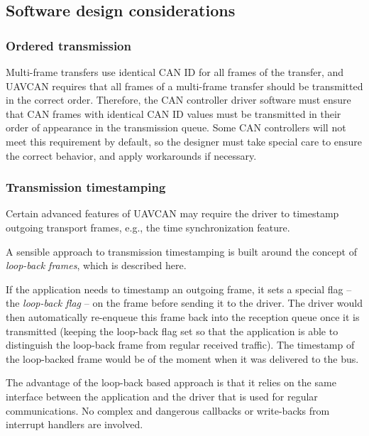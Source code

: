 \subsection{Software design considerations}

\subsubsection{Ordered transmission}

Multi-frame transfers use identical CAN ID for all frames of the transfer,
and UAVCAN requires that all frames of a multi-frame transfer should be transmitted in the correct order.
Therefore, the CAN controller driver software must ensure that CAN frames with identical CAN ID values
must be transmitted in their order of appearance in the transmission queue.
Some CAN controllers will not meet this requirement by default,
so the designer must take special care to ensure the correct behavior, and apply workarounds if necessary.

\subsubsection{Transmission timestamping}

Certain advanced features of UAVCAN may require the driver to timestamp outgoing transport frames, e.g.,
the time synchronization feature.

\begin{remark}[breakable]
    A sensible approach to transmission timestamping is built around the concept of \emph{loop-back frames},
    which is described here.

    If the application needs to timestamp an outgoing frame, it sets a special flag -- the \emph{loop-back flag} --
    on the frame before sending it to the driver.
    The driver would then automatically re-enqueue this frame back into the reception queue once it is transmitted
    (keeping the loop-back flag set so that the application is able to distinguish the loop-back
    frame from regular received traffic).
    The timestamp of the loop-backed frame would be of the moment when it was delivered to the bus.

    The advantage of the loop-back based approach is that it relies on the same interface between
    the application and the driver that is used for regular communications.
    No complex and dangerous callbacks or write-backs from interrupt handlers are involved.
\end{remark}

